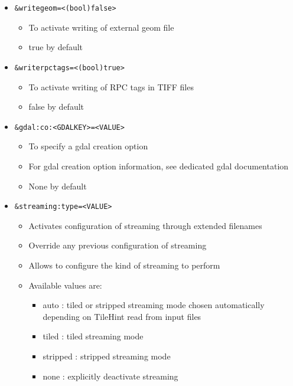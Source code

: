 \begin{itemize}

\item \begin{verbatim}&writegeom=<(bool)false>\end{verbatim}
  \begin{itemize}
  \item To activate writing of external geom file
  \item true by default
  \end{itemize}  
\item \begin{verbatim}&writerpctags=<(bool)true>\end{verbatim}
  \begin{itemize}
  \item To activate writing of RPC tags in TIFF files
  \item false by default
  \end{itemize}  
\item \begin{verbatim}&gdal:co:<GDALKEY>=<VALUE>\end{verbatim}
  \begin{itemize}
  \item To specify a gdal creation option
  \item For gdal creation option information, see dedicated gdal documentation
  \item None by default 
  \end{itemize}
\item \begin{verbatim}&streaming:type=<VALUE>\end{verbatim}
  \begin{itemize}
  \item Activates configuration of streaming through extended filenames
  \item Override any previous configuration of streaming
  \item Allows to configure the kind of streaming to perform
  \item Available values are:
    \begin{itemize}
    \item auto : tiled or stripped streaming mode chosen automatically depending on TileHint read from input files
    \item tiled : tiled streaming mode
    \item stripped : stripped streaming mode
    \item none : explicitly deactivate streaming 

\end{itemize}
\end{itemize}
\end{itemize}
